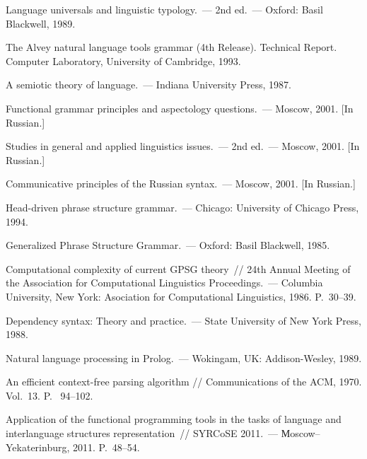\begin{multicols}{2}
{{\begin{thebibliography}{99}
     Language universals and  linguistic typology.~--- 2nd ed.~--- Oxford: Basil 
Blackwell, 1989.
     
     The Alvey natural language tools grammar (4th Release). Technical Report. 
Computer Laboratory, University of Cambridge, 1993.
     
     A semiotic theory of language.~--- Indiana University Press, 1987.
     
     Functional grammar principles and aspectology questions.~--- 
Moscow, 2001. [In Russian.]
     
Studies in general and applied linguistics issues.~--- 2nd ed.~--- Moscow, 
 2001. [In Russian.]
     
Communicative principles of the Russian syntax.~--- Moscow, 2001. [In 
Russian.]
     
     Head-driven phrase structure grammar.~--- Chicago: University of Chicago 
Press, 1994.
     
     Generalized Phrase Structure Grammar.~--- Oxford: Basil Blackwell, 1985.
     
     Computational complexity of current GPSG theory~// 24th Annual Meeting 
of the Association for Computational Linguistics Proceedings.~--- Columbia 
University, New York: Asociation for Computational Linguistics, 1986. P.~30--39.
     
     Dependency syntax: Theory and practice.~--- State University of New York 
Press, 1988.
     
     Natural language processing in Prolog.~--- Wokingam, UK: 
     Addison-Wesley, 1989.
     
     An efficient context-free parsing algorithm // Communications of the ACM, 
1970. Vol.~13. P.~ 94--102.
     
      Application of the functional programming tools in the tasks of language 
and interlanguage structures representation~// SYRCoSE 2011.~--- 
Мoscow--Yekaterinburg, 2011. P.~48--54.     


\end{thebibliography}}}
\end{multicols}
